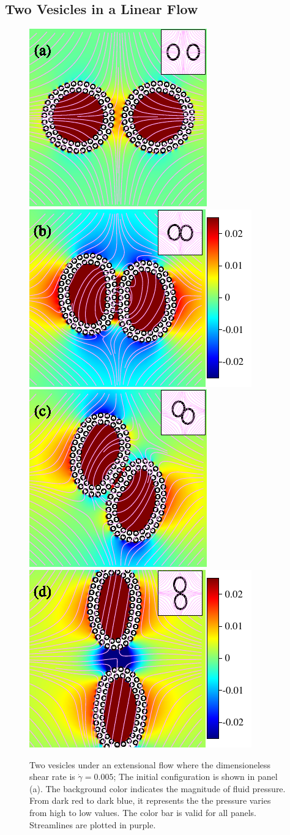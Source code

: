 \documentclass[lineno]{jfm}
\begin{document}
%


\subsection{Two Vesicles in a Linear Flow}

\begin{figure}
\centering
\includegraphics[height=2.in]{N116_ext_0.pdf}
\includegraphics[height=2.in]{N116_ext_2500.pdf}\\
\includegraphics[height=2.in]{N116_ext_5000.pdf}
\includegraphics[height=2.in]{N116_ext_7500.pdf}
  \caption{Two vesicles under an extensional flow where the dimensioneless shear rate is $\dot\gamma=0.005$; The initial configuration is shown in panel (a). The background color indicates the magnitude of fluid pressure. From dark red to dark blue, it represents the the pressure varies from high to low values. The color bar is valid for all panels. Streamlines are plotted in purple.
  }
    \label{figure8}
\end{figure}
\end{document}
